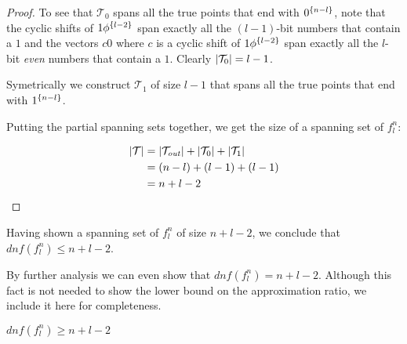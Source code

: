 \begin{proof}
To see that $\mathcal{T}_0$ spans all the true points
that end with $0^{\{n-l\}}$,
note that the cyclic shifts of $1 \phi^{\{l-2\}}$
span exactly all the $(l-1)$-bit numbers
that contain a $1$
and the vectors $c 0$
where $c$ is a cyclic shift of $1 \phi^{\{l-2\}}$
span exactly all the $l$-bit \emph{even} numbers
that contain a $1$.
Clearly $\lvert\mathcal{T}_0\rvert = l-1$.

Symetrically we construct $\mathcal{T}_1$ of size $l-1$
that spans all the true points
that end with $1^{\{n-l\}}$.

Putting the partial spanning sets together,
we get the size of a spanning set of $f_l^n$:

\begin{align*}
\lvert\mathcal{T}\rvert
&= \lvert\mathcal{T}_{\mathit{out}}\rvert
+ \lvert\mathcal{T}_0\rvert + \lvert\mathcal{T}_1\rvert \\
&= (n-l) + (l-1) + (l-1) \\
&= n + l - 2
\end{align*}
\end{proof}

Having shown a spanning set of $f_l^n$ of size $n+l-2$,
we conclude that $dnf(f_l^n) \leq n+l-2$.

By further analysis we can even show that $dnf(f^n_l)=n+l-2$.
Although this fact is not needed to show the lower bound on the approximation ratio,
we include it here for completeness.

\begin{lemma}
$dnf(f_l^n) \geq n+l-2$
\end{lemma}


